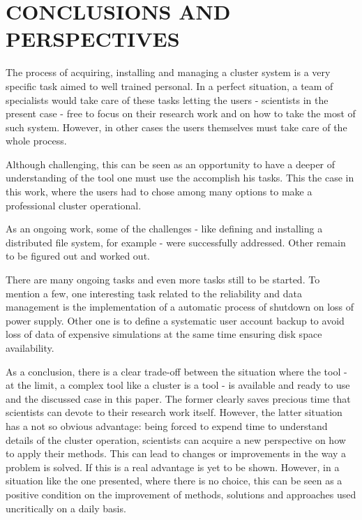 \documentclass[twoside,a4paper,12pt,english]{inac17}
\begin{document}

\section{CONCLUSIONS AND PERSPECTIVES}


The process of acquiring, installing and managing a cluster system is a very specific task aimed to well trained
personal. In a perfect situation, a team of specialists would take care of these tasks letting the users - scientists in the present case -
free to focus on their research work and on how to take the most of such system. However, in other cases the users themselves must
take care of the whole process.

Although challenging, this can be seen as an opportunity to have a deeper of understanding of the tool one must use the accomplish his tasks.
This the case in this work, where the users had to chose among many options to make a professional cluster operational.

As an ongoing work, some of the challenges - like defining and installing a distributed file system, for example - were successfully
addressed. Other remain to be figured out and worked out.

There are many ongoing tasks and even more tasks still to be started. To mention a few, one
interesting task related to the reliability and data management is the implementation of
a automatic process of shutdown on loss of power supply. Other one is to define a systematic
user account backup to avoid loss of data of expensive simulations at the same time ensuring
disk space availability.

As a conclusion, there is a clear trade-off between the situation where the tool - at the limit, a complex tool like a cluster is a tool - is available and ready to use and
the discussed case in this paper. The former clearly saves precious time that scientists can devote to their research work itself. However, the latter situation has a not so obvious
advantage: being forced to expend time to understand details of the cluster operation, scientists can acquire a new perspective on how to apply their
methods. This can lead to changes or improvements in the way a problem is solved. If this is a real advantage is yet to be shown. However,
in a situation like the one presented, where there is no choice, this can be seen as a positive condition on the improvement of methods, solutions and approaches used
uncritically on a daily basis.
\end{document}
